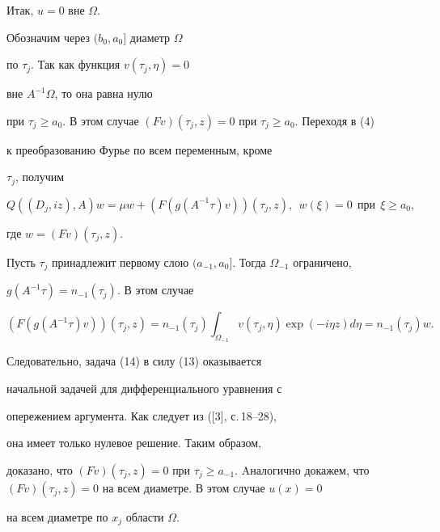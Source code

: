 \begin{pf}


Итак, $u=0$ вне $\Omega$.


Обозначим через $(b_{0}, a_{0}]$ диаметр $\Omega$


по $\tau_{j}. $ Так как функция $v(\tau_{j}, \eta)=0$


вне $A^{-1}\Omega$, то она равна нулю


при $\tau_{j} \ge a_{0}$. В этом случае $(Fv)(\tau_{j}, 


z)=0$ при $\tau_{j} \ge a_{0}. $ Переходя в (4)


к преобразованию Фурье по всем переменным, кроме


$\tau_{j}$, получим


\begin{equation}


Q((D_{j}, iz), A)w=\mu w + (F(g(A^{-1}\tau)v))(\tau_{j}, 


z), \ \ w(\xi)=0\ \ \text{при} \ \ \xi \ge a_{0}, 


\end{equation}


где $w =(Fv)(\tau_{j}, z)$.





Пусть $\tau_{j}$ принадлежит первому слою $(a_{-1}, 


a_{0}]$. Тогда $\Omega_{-1}$ ограничено, 


$g(A^{-1}\tau )=n_{-1}(\tau_{j})$. В этом случае


$$


(F(g(A^{-1}\tau) v))(\tau_{j}, z)= n_{-1}(\tau_{j})


\int_{\Omega_{-1}} v(\tau_{j}, \eta) \exp (-i\eta z)


d \eta =n_{-1}(\tau_{j})w.


$$


Следовательно, задача (14) в силу (13) оказывается


начальной задачей для дифференциального уравнения с


опережением аргумента. Как следует из ([3], с.\,18--28),


она имеет только нулевое решение. Таким образом, 


доказано, что $(Fv)(\tau_{j}, z)=0$ при $\tau_{j}


\ge a_{-1}$. Aналогично докажем, что $(Fv)(\tau_{j}, z)


=0$ на всем диаметре. В этом случае $u(x)=0$


на всем диаметре по $x_{j}$ области $\Omega$.


\end{pf}





